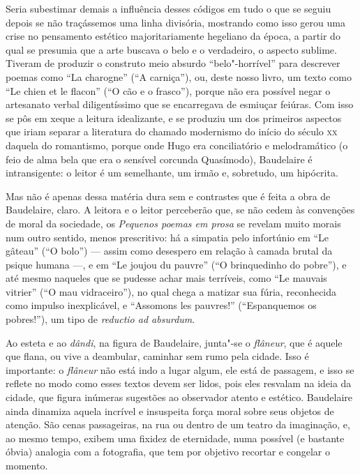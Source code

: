 Seria subestimar demais a influência desses códigos em tudo o que se
seguiu depois se não traçássemos uma linha divisória, mostrando como
isso gerou uma crise no pensamento estético majoritariamente hegeliano
da época, a partir do qual se presumia que a arte buscava o belo e o
verdadeiro, o aspecto sublime. Tiveram de produzir o construto meio
absurdo “belo"-horrível” para descrever poemas como “La charogne” (“A
carniça”), ou, deste nosso livro, um texto como “Le chien et le flacon”
(“O cão e o frasco”), porque não era possível negar o artesanato verbal
diligentíssimo que se encarregava de esmiuçar feiúras. Com isso se pôs
em xeque a leitura idealizante, e se produziu um dos primeiros aspectos
que iriam separar a literatura do chamado modernismo do início do
século \textsc{xx} daquela do romantismo, porque onde Hugo era conciliatório e
melodramático (o feio de alma bela que era o sensível corcunda
Quasímodo), Baudelaire é intransigente: o leitor é um semelhante, um
irmão e, sobretudo, um hipócrita.

Mas não é apenas dessa matéria dura sem e contrastes que é feita a obra de
Baudelaire, claro. A leitora e o leitor perceberão que, se não cedem
às convenções de moral da sociedade, os \textit{Pequenos poemas em
prosa} se revelam muito morais num outro sentido, menos prescritivo: há
a simpatia pelo infortúnio em “Le gâteau” (“O bolo”) --- assim como desespero
em relação à camada brutal da psique humana ---, e em “Le joujou du pauvre”
(“O brinquedinho do pobre”), e até mesmo naqueles que se pudesse achar
mais terríveis, como “Le mauvais vitrier” (“O mau vidraceiro”), no qual
chega a matizar sua fúria, reconhecida como impulso inexplicável, e
“Assomons les pauvres!” (“Espanquemos os pobres!”), um tipo de
\textit{reductio ad absurdum}.

Ao esteta e ao \textit{dândi}, na figura de Baudelaire, junta"-se o
\textit{flâneur}, que é aquele que flana, ou vive a deambular, caminhar
sem rumo pela cidade. Isso é importante: o \textit{flâneur} não está
indo a lugar algum, ele está de passagem, e isso se reflete no modo
como esses textos devem ser lidos, pois eles resvalam na ideia da
cidade, que figura inúmeras sugestões ao observador atento e estético.
Baudelaire ainda dinamiza aquela incrível e insuspeita força moral
sobre seus objetos de atenção. São cenas passageiras, na rua ou dentro
de um teatro da imaginação, e, ao mesmo tempo, exibem uma fixidez de
eternidade, numa possível (e bastante óbvia) analogia com
a fotografia, que tem por objetivo recortar e congelar o momento. 


